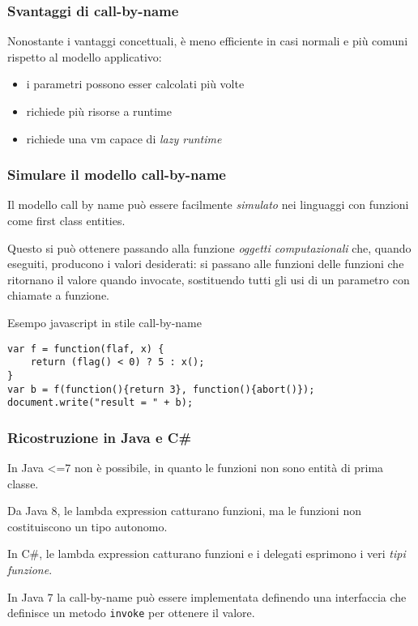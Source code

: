 \subsubsection{Svantaggi di call-by-name}
Nonostante i vantaggi concettuali, è meno efficiente in casi normali e più comuni rispetto al modello applicativo:
\begin{itemize}
    \item i parametri possono esser calcolati più volte
    \item richiede più risorse a runtime
    \item richiede una vm capace di \textit{lazy runtime}
\end{itemize}

\subsubsection{Simulare il modello call-by-name}
Il modello call by name può essere facilmente \textit{simulato} nei linguaggi con funzioni come first class entities.

Questo si può ottenere passando alla funzione \textit{oggetti computazionali} che, quando eseguiti, producono i valori desiderati: si passano alle funzioni delle funzioni che ritornano il valore quando invocate, sostituendo tutti gli usi di un parametro con chiamate a funzione.

Esempo javascript in stile call-by-name
\begin{verbatim}
var f = function(flaf, x) {
    return (flag() < 0) ? 5 : x();
}
var b = f(function(){return 3}, function(){abort()});
document.write("result = " + b);
\end{verbatim}

\subsubsection{Ricostruzione in Java e C\#}
In Java <=7 non è possibile, in quanto le funzioni non sono entità di prima classe.

Da Java 8, le lambda expression catturano funzioni, ma le funzioni non costituiscono un tipo autonomo.

In  C\#, le lambda expression catturano funzioni e i delegati esprimono i veri \textit{tipi funzione}.

In Java 7 la call-by-name può essere implementata definendo una interfaccia che definisce un metodo \texttt{invoke} per ottenere il valore.

